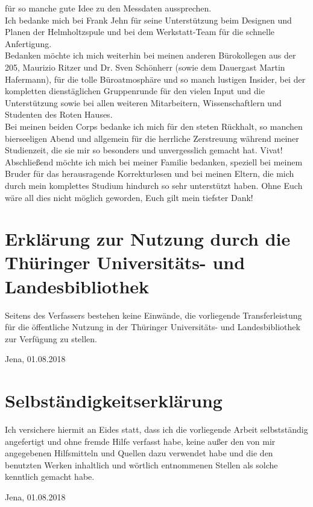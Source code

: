 für so manche gute Idee zu den Messdaten aussprechen.\\ Ich bedanke mich bei
Frank Jehn für seine Unterstützung beim Designen und Planen der Helmholtzspule
und bei dem Werkstatt-Team für die schnelle Anfertigung.\\ Bedanken möchte ich
mich weiterhin bei meinen anderen Bürokollegen aus der 205, Maurizio Ritzer und
Dr. Sven Schönherr (sowie dem Dauergast Martin Hafermann), für die tolle
Büroatmosphäre und so manch lustigen Insider, bei der kompletten dienstäglichen
Gruppenrunde für den vielen Input und die Unterstützung sowie bei allen weiteren
Mitarbeitern, Wissenschaftlern und Studenten des Roten Hauses.\\ Bei meinen
beiden Corps bedanke ich mich für den steten Rückhalt, so manchen bierseeligen
Abend und allgemein für die herrliche Zerstreuung während meiner Studienzeit,
die sie mir so besonders und unvergesslich gemacht hat. Vivat! \\ Abschließend
möchte ich mich bei meiner Familie bedanken, speziell bei meinem Bruder für das
herausragende Korrekturlesen und bei meinen Eltern, die mich durch mein
komplettes Studium hindurch so sehr unterstützt haben. Ohne Euch wäre all dies
nicht möglich geworden, Euch gilt mein tiefster Dank! \newpage
\thispagestyle{empty} \section*{Erklärung zur Nutzung durch die Thüringer
Universitäts- und Landesbibliothek} Seitens des Verfassers bestehen keine
Einwände, die vorliegende Transferleistung für die öffentliche Nutzung in der
Thüringer Universitäts- und Landesbibliothek zur Verfügung zu stellen.
\vspace*{2cm}

\begin{flushright} Jena, 01.08.2018 \end{flushright} \vspace*{2cm}
\section*{Selbständigkeitserklärung} Ich versichere hiermit an Eides statt, dass
ich die vorliegende Arbeit selbstständig angefertigt und ohne fremde Hilfe
verfasst habe, keine außer den von mir angegebenen Hilfsmitteln und Quellen dazu
verwendet habe und die den benutzten Werken inhaltlich und wörtlich entnommenen
Stellen als solche kenntlich gemacht habe. \vspace*{2cm}

\begin{flushright} Jena, 01.08.2018 \end{flushright}
